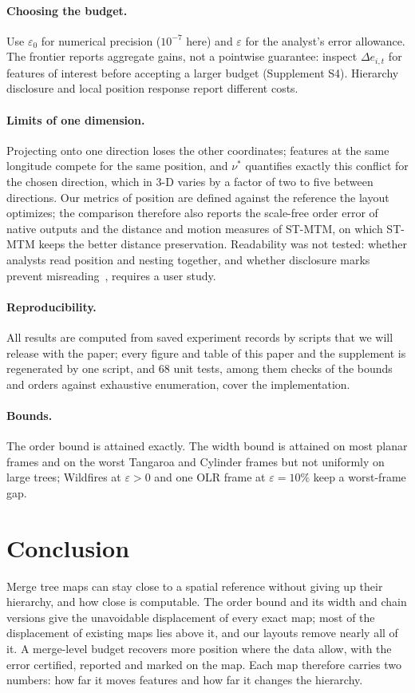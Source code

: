 \documentclass[review]{vgtc}                 %
\begin{document}
\paragraph{Choosing the budget.} Use $\varepsilon_0$ for numerical precision ($10^{-7}$ here) and $\varepsilon$ for the analyst's error allowance. The frontier reports aggregate gains, not a pointwise guarantee: inspect $\Delta e_{i,t}$ for features of interest before accepting a larger budget (Supplement S4). Hierarchy disclosure and local position response report different costs.

\paragraph{Limits of one dimension.} Projecting onto one direction loses the other coordinates; features at the same longitude compete for the same position, and $\nu^*$ quantifies exactly this conflict for the chosen direction, which in 3-D varies by a factor of two to five between directions. Our metrics of position are defined against the reference the layout optimizes; the comparison therefore also reports the scale-free order error of native outputs and the distance and motion measures of ST-MTM, on which ST-MTM keeps the better distance preservation. Readability was not tested: whether analysts read position and nesting together, and whether disclosure marks prevent misreading~\cite{Kamakshidasan:2021:MM,McNutt:2020:SVM}, requires a user study.

\paragraph{Reproducibility.} All results are computed from saved experiment records by scripts that we will release with the paper; every figure and table of this paper and the supplement is regenerated by one script, and 68 unit tests, among them checks of the bounds and orders against exhaustive enumeration, cover the implementation.

\paragraph{Bounds.} The order bound is attained exactly. The width bound is attained on most planar frames and on the worst Tangaroa and Cylinder frames but not uniformly on large trees; Wildfires at $\varepsilon>0$ and one OLR frame at $\varepsilon=10\%$ keep a worst-frame gap.

\section{Conclusion}
Merge tree maps can stay close to a spatial reference without giving up their hierarchy, and how close is computable. The order bound and its width and chain versions give the unavoidable displacement of every exact map; most of the displacement of existing maps lies above it, and our layouts remove nearly all of it. A merge-level budget recovers more position where the data allow, with the error certified, reported and marked on the map. Each map therefore carries two numbers: how far it moves features and how far it changes the hierarchy.



\end{document}
